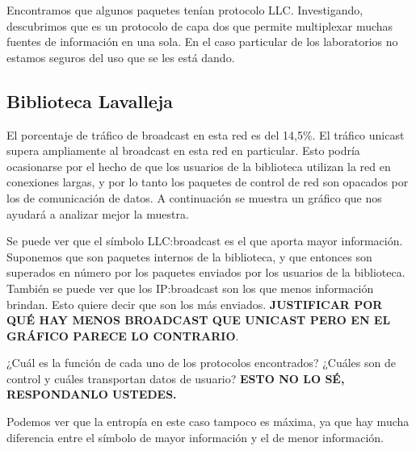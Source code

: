 
Encontramos que algunos paquetes tenían protocolo LLC. Investigando, descubrimos
que es un protocolo de capa dos que permite multiplexar muchas fuentes de
información en una sola. En el caso particular de los laboratorios no
estamos seguros del uso que se les está dando.





\subsection{Biblioteca Lavalleja}

El porcentaje de tráfico de broadcast en esta red es del 14,5\%. El tráfico unicast supera ampliamente
al broadcast en esta red en particular. Esto podría ocasionarse por el hecho de que los
usuarios de la biblioteca utilizan la red en conexiones largas, y por lo tanto los paquetes
de control de red son opacados por los de comunicación de datos. A continuación se muestra un
gráfico que nos ayudará a analizar mejor la muestra.



Se puede ver que el símbolo LLC:broadcast es el que aporta mayor información.
Suponemos que son paquetes internos de la biblioteca, y que entonces son
superados en número por los paquetes enviados por los usuarios de la biblioteca.
También se puede ver que los IP:broadcast son los que menos información brindan.
Esto quiere decir que son los más enviados. 
\textbf{JUSTIFICAR POR QUÉ HAY MENOS BROADCAST QUE UNICAST PERO EN EL GRÁFICO
PARECE LO CONTRARIO}.


¿Cuál es la función de cada uno de los protocolos encontrados? 
¿Cuáles son de control y cuáles transportan datos de usuario? 
\textbf{ESTO NO LO SÉ, RESPONDANLO USTEDES.}


Podemos ver que la entropía en este caso tampoco es máxima, ya que hay mucha 
diferencia entre el símbolo de mayor información y el de menor información.
